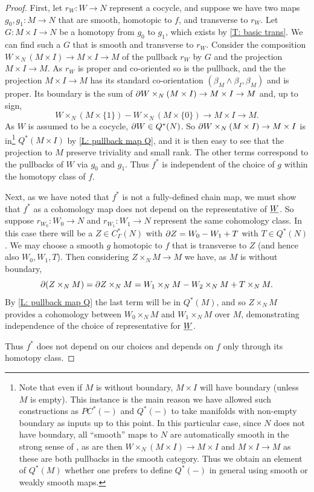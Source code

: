 \begin{proof}
First, let $r_W \colon W \to N$ represent a cocycle, and suppose we have two maps $g_0, g_1:M \to N$ that are smooth, homotopic to $f$, and transverse to $r_W$.
Let $G:M \times I \to N$ be a homotopy from $g_0$ to $g_1$, which exists by \cref{T: basic trans}. We can find such a $G$ that is smooth and transverse to $r_W$. Consider the composition $W\times_N (M \times I) \to M \times I \to M$ of the pullback $r_W$ by $G$ and the projection $M \times I \to M$. As $r_W$ is proper and co-oriented so is the pullback, and the the projection $M \times I \to M$ has its standard co-orientation $(\beta_M \wedge \beta_I,\beta_M)$ and is proper. Its boundary is the sum of $\partial W\times_N (M \times I) \to M \times I \to M$ and, up to sign, $$W\times_N (M \times \{1\}) - W\times_N(M \times \{0\}) \to M \times I \to M.$$ As $W$ is assumed to be a cocycle, $\partial W \in Q^*(N)$. So $\partial W\times_N (M \times I) \to M \times I$ is in\footnote{Note that even if $M$ is without boundary, $M \times I$ will have boundary (unless $M$ is empty). This instance is the main reason we have allowed such constructions as $PC^*(-)$ and $Q^*(-)$ to take manifolds with non-empty boundary as inputs up to this point. In this particular case, since $N$ does not have boundary, all ``smooth'' maps to $N$ are automatically smooth in the strong sense of \cite{Joy12}, as are then $W\times_N (M \times I) \to M \times I$ and $M \times I \to M$ as these are both pullbacks in the smooth category. Thus we obtain an element of $Q^*(M)$ whether one prefers to define $Q^*(-)$ in general using smooth or weakly smooth maps.} $Q^*(M \times I)$ by \cref{L: pullback map Q}, and it is then easy to see that the projection to $M$ preserve triviality and small rank. The other terms correspond to the pullbacks of $W$ via $g_0$ and $g_1$. Thus $f^*$ is independent of the choice of $g$ within the homotopy class of $f$.

Next, as we have noted that $f^*$ is not a fully-defined chain map, we must show that $f^*$ as a cohomology map does not depend on the representative of $\underline{W}$. So suppose $r_{W_0}:W_0 \to N$ and $r_{W_1}:W_1 \to N$ represent the same cohomology class. In this case there will be a $Z \in C^*_\Gamma(N)$ with $\partial Z = W_0-W_1+T$ with $T \in Q^*(N)$. We may choose a smooth $g$ homotopic to $f$ that is transverse to $Z$ (and hence also $W_0,W_1, T$). Then considering $Z\times_N M \to M$ we have, as $M$ is without boundary,
$$\partial(Z\times_N M) = \partial Z\times_N M = W_1\times_N M -W_2\times_N M+T\times_N M.$$
By \cref{L: pullback map Q} the last term will be in $Q^*(M)$, and so $Z\times_NM$ provides a cohomology between $W_0\times_NM$ and $W_1\times_NM$ over $M$, demonstrating independence of the choice of representative for $\underline{W}$.

Thus $f^*$ does not depend on our choices and depends on $f$ only through its homotopy class.
\end{proof}

